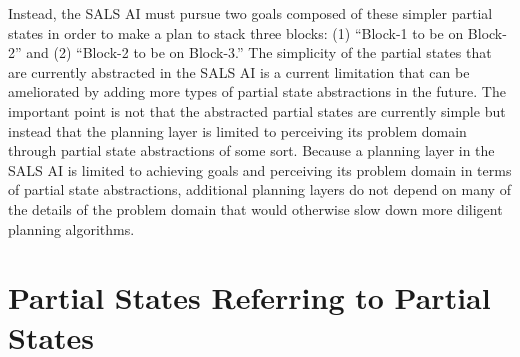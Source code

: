 Instead, the SALS AI must pursue two goals composed of these simpler
partial states in order to make a plan to stack three blocks: (1)
``Block-1 to be on Block-2'' and (2) ``Block-2 to be on Block-3.''
The simplicity of the partial states that are currently abstracted in
the SALS AI is a current limitation that can be ameliorated by adding
more types of partial state abstractions in the future.  The important
point is not that the abstracted partial states are currently simple
but instead that the planning layer is limited to perceiving its
problem domain through partial state abstractions of some sort.
Because a planning layer in the SALS AI is limited to achieving goals
and perceiving its problem domain in terms of partial state
abstractions, additional planning layers do not depend on many of the
details of the problem domain that would otherwise slow down more
diligent planning algorithms.

\section{Partial States Referring to Partial States}

